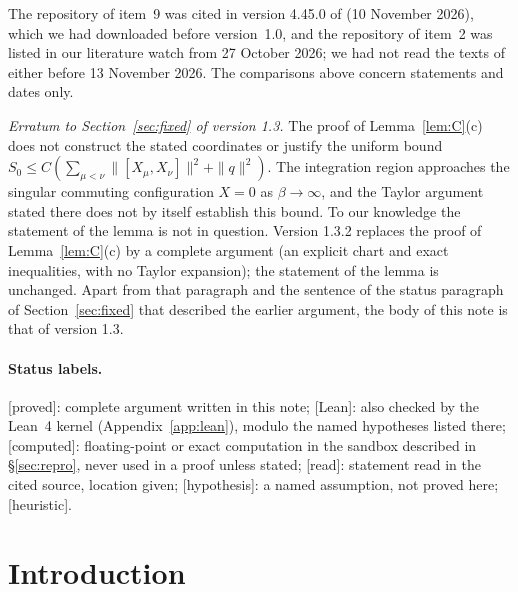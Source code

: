 \documentclass[11pt,a4paper]{article}
\theoremstyle{plain}
\theoremstyle{definition}
\theoremstyle{remark}
\numberwithin{equation}{section}
\newcommand{\st}[1]{\textsf{[#1]}}
\begin{document}
The repository of item~9 was cited in version 4.45.0 of \cite{BB26} (10 November 2026), which we had downloaded before version~1.0, and the repository of item~2 was listed in our literature watch from 27 October 2026; we had not read the texts of either before 13 November 2026. The comparisons above concern statements and dates only.
\par\medskip\noindent\textit{Erratum to Section~\ref{sec:fixed} of version 1.3.} The proof of Lemma~\ref{lem:C}(c) does not construct the stated coordinates or justify the uniform bound $S_0\le C(\sum_{\mu<\nu}\|[X_\mu,X_\nu]\|^2+\|q\|^2)$. The integration region approaches the singular commuting configuration $X=0$ as $\beta\to\infty$, and the Taylor argument stated there does not by itself establish this bound. To our knowledge the statement of the lemma is not in question. Version 1.3.2 replaces the proof of Lemma~\ref{lem:C}(c) by a complete argument (an explicit chart and exact inequalities, with no Taylor expansion); the statement of the lemma is unchanged. Apart from that paragraph and the sentence of the status paragraph of Section~\ref{sec:fixed} that described the earlier argument, the body of this note is that of version 1.3.
\endgroup


\paragraph{Status labels.}
\st{proved}: complete argument written in this note; \st{Lean}: also checked by the Lean~4 kernel (Appendix~\ref{app:lean}), modulo
the named hypotheses listed there; \st{computed}: floating-point or exact computation in the sandbox described in
\S\ref{sec:repro}, never used in a proof unless stated; \st{read}: statement read in the cited source, location given;
\st{hypothesis}: a named assumption, not proved here; \st{heuristic}.

{\small\setcounter{tocdepth}{1}\tableofcontents}

\section{Introduction}\label{sec:intro}
\end{document}
